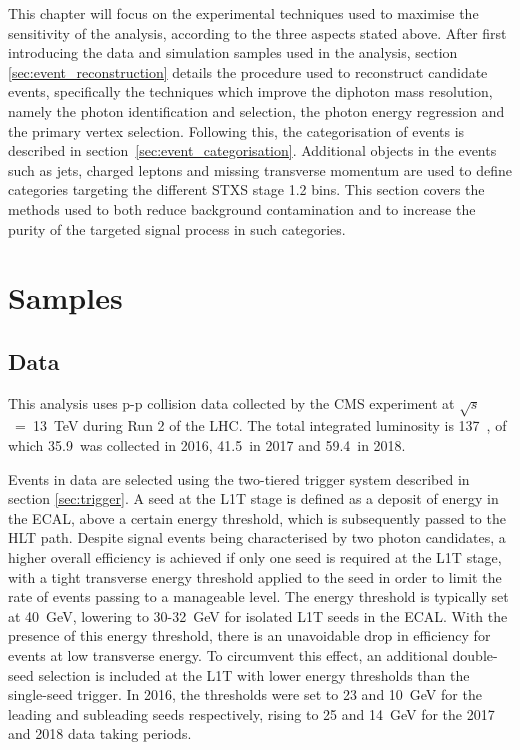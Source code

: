 This chapter will focus on the experimental techniques used to maximise the sensitivity of the analysis, according to the three aspects stated above. After first introducing the data and simulation samples used in the analysis, section \ref{sec:event_reconstruction} details the procedure used to reconstruct candidate \Hgg events, specifically the techniques which improve the diphoton mass resolution, namely the photon identification and selection, the photon energy regression and the primary vertex selection. Following this, the categorisation of events is described in section~\ref{sec:event_categorisation}. Additional objects in the events such as jets, charged leptons and missing transverse momentum are used to define categories targeting the different STXS stage 1.2 bins. This section covers the methods used to both reduce background contamination and to increase the purity of the targeted signal process in such categories.








\section{Samples}
\subsection{Data}
This analysis uses p-p collision data collected by the CMS experiment at $\sqrt{s}$~=~13~TeV during Run 2 of the LHC. The total integrated luminosity is 137~\fbinv, of which 35.9~\fbinv was collected in 2016, 41.5~\fbinv in 2017 and 59.4~\fbinv in 2018.

Events in data are selected using the two-tiered trigger system described in section \ref{sec:trigger}. A seed at the L1T stage is defined as a deposit of energy in the ECAL, above a certain energy threshold, which is subsequently passed to the HLT path. Despite signal events being characterised by two photon candidates, a higher overall efficiency is achieved if only one seed is required at the L1T stage, with a tight transverse energy threshold applied to the seed in order to limit the rate of events passing to a manageable level. The energy threshold is typically set at 40~GeV, lowering to 30-32~GeV for isolated L1T seeds in the ECAL. With the presence of this energy threshold, there is an unavoidable drop in efficiency for \Hgg events at low transverse energy. To circumvent this effect, an additional double-seed selection is included at the L1T with lower energy thresholds than the single-seed trigger. In 2016, the thresholds were set to 23 and 10~GeV for the leading and subleading seeds respectively, rising to 25 and 14~GeV for the 2017 and 2018 data taking periods.

